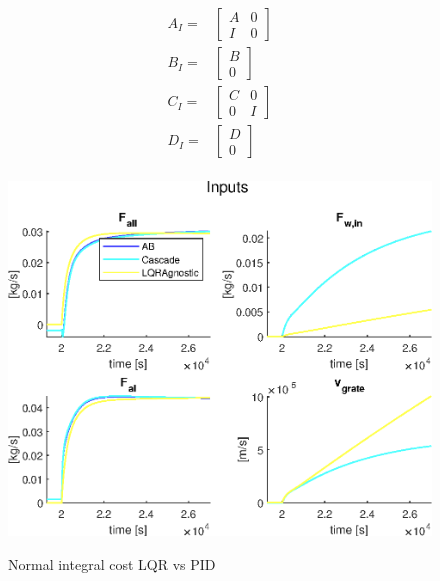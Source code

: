 \begin{align}
 A_{I} =& 
 \begin{bmatrix}
 A & 0 \\
 I & 0
 \end{bmatrix}\\
 B_{I} =& 
 \begin{bmatrix}
 B \\
 0
 \end{bmatrix}\\
 C_{I} =& 
 \begin{bmatrix}
 C & 0 \\
 0 & I
 \end{bmatrix}\\
  D_{I} =& 
 \begin{bmatrix}
 D \\
 0 
 \end{bmatrix}\\
\end{align}

\begin{figure}
    \includegraphics[width=\textwidth]{img/Fig_dump/inputs_ABCascadeLQRAgnosticStep_Q_all.eps}
    \label{fig:integral_controller_comparison}
    \caption{Normal integral cost LQR vs PID}
\end{figure}

